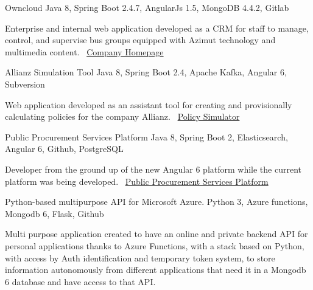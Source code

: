 \documentclass[]{awesome-cv}
\begin{document}
\begin{cventries}
	\vspace{-3mm}
	\cventry
	{}
	{Owncloud \vspace{-5mm}}
	{Java 8, Spring Boot 2.4.7, AngularJs 1.5, MongoDB 4.4.2, Gitlab \vspace{-5mm}}
	{}
	{\begin{cvsectionnormaltext}
		\item {Enterprise and internal web application developed as a CRM for staff to manage, control, and supervise bus groups equipped with Azimut technology and multimedia content. 
		\newline \faLink\ \href{https://www.azimutelectronics.com}{Company Homepage}}
	\end{cvsectionnormaltext}}

	\vspace{-3mm}
	\cventry
	{}
	{Allianz Simulation Tool \vspace{-5mm}}
	{Java 8, Spring Boot 2.4, Apache Kafka, Angular 6, Subversion \vspace{-5mm}}
	{}
	{\begin{cvsectionnormaltext}
		\item{Web application developed as an assistant tool for creating and provisionally calculating policies for the company Allianz.
      \newline \faLink\ \href{https://www.allianzdirect.es/seguro-de-coche/calcular-precio/}{Policy Simulator}}
	\end{cvsectionnormaltext}}
	
	\vspace{-3mm}
	\cventry
	{}
	{Public Procurement Services Platform \vspace{-5mm}}
	{Java 8, Spring Boot 2, Elasticsearch, Angular 6, Github, PostgreSQL \vspace{-5mm}}
	{}
	{\begin{cvsectionnormaltext}
		\item{Developer from the ground up of the new Angular 6 platform while the current platform was being developed.
		\newline \faLink\ \href{https://contractaciopublica.cat/ca/inici}{Public Procurement Services Platform}}
	\end{cvsectionnormaltext}}
 
    \cventry
	{}
	{Python-based multipurpose API for Microsoft Azure. \vspace{-5mm}}
	{Python 3, Azure functions, Mongodb 6, Flask, Github \vspace{-5mm}}
	{}
	{\begin{cvsectionnormaltext}
		\item{Multi purpose application created to have an online and private backend API for personal applications thanks to Azure Functions, with a stack based on Python, with access by Auth identification and temporary token system, to store information autonomously from different applications that need it in a Mongodb 6 database and have access to that API.
		\newline}
	\end{cvsectionnormaltext}}


\end{cventries}
\end{document}
